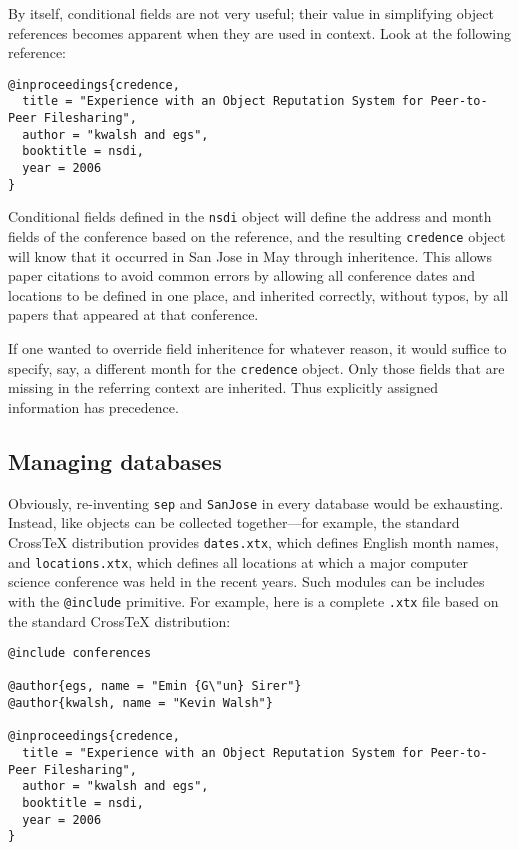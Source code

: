 \documentclass{article}
\newcommand{\XTeX}{Cross\TeX}
\begin{document}
By itself, conditional fields are not very useful; their value in 
simplifying object references becomes apparent when they are used
in context. Look at the following reference:

\begin{small}\begin{verbatim}
@inproceedings{credence,
  title = "Experience with an Object Reputation System for Peer-to-Peer Filesharing",
  author = "kwalsh and egs",
  booktitle = nsdi,
  year = 2006
}
\end{verbatim}\end{small}

Conditional fields defined in the \texttt{nsdi} object will define the
address and month fields of the conference based on the reference, 
and the resulting \texttt{credence} object will know that it occurred
in San Jose in May through inheritence. This allows paper citations
to avoid common errors by allowing all conference dates and locations
to be defined in one place, and inherited correctly, without typos,
by all papers that appeared at that conference. 

If one wanted to override field inheritence for whatever reason, it would suffice to specify, say, a different month for the \texttt{credence} object. Only those fields that are missing in the referring context are inherited. Thus explicitly assigned information has precedence.

\subsection{Managing databases}

Obviously, re-inventing \texttt{sep} and \texttt{SanJose} in every
database would be exhausting. Instead, like objects can be collected
together---for example, the standard \XTeX{} distribution provides 
\texttt{dates.xtx}, which defines English month names, and 
\texttt{locations.xtx}, which defines all locations at which a 
major computer science conference was held in the recent years.
Such modules can be includes with the \texttt{@include} primitive.
For example, here is a complete \texttt{.xtx}
file based on the standard \XTeX{} distribution:

\begin{small}\begin{verbatim}
@include conferences

@author{egs, name = "Emin {G\"un} Sirer"}
@author{kwalsh, name = "Kevin Walsh"}

@inproceedings{credence,
  title = "Experience with an Object Reputation System for Peer-to-Peer Filesharing",
  author = "kwalsh and egs",
  booktitle = nsdi,
  year = 2006
}
\end{verbatim}\end{small}
\end{document}
